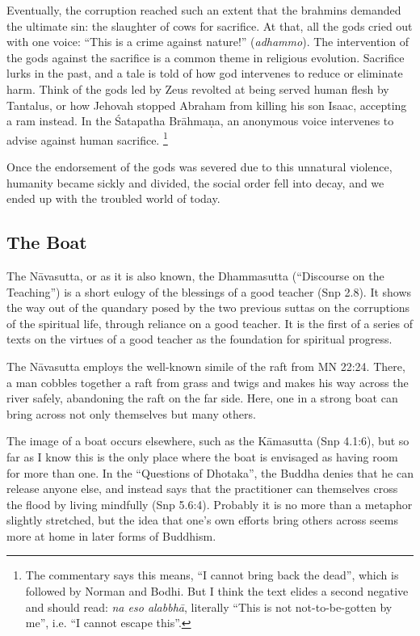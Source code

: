 \documentclass[12pt,openany]{book}%
\begin{document}
Eventually, the corruption reached such an extent that the brahmins demanded the ultimate sin: the slaughter of cows for sacrifice. At that, all the gods cried out with one voice: “This is a crime against nature!” (\textit{adhammo}). The intervention of the gods against the sacrifice is a common theme in religious evolution. Sacrifice lurks in the past, and a tale is told of how god intervenes to reduce or eliminate harm. Think of the gods led by Zeus revolted at being served human flesh by Tantalus, or how Jehovah stopped Abraham from killing his son Isaac, accepting a ram instead. In the Śatapatha \textsanskrit{Brāhmaṇa}, an anonymous voice intervenes to advise against human sacrifice. \footnote{The commentary says this means, “I cannot bring back the dead”, which is followed by Norman and Bodhi. But I think the text elides a second negative and should read: \textit{na eso \textsanskrit{alabbhā}}, literally “This is not not-to-be-gotten by me”, i.e. “I cannot escape this”. }

Once the endorsement of the gods was severed due to this unnatural violence, humanity became sickly and divided, the social order fell into decay, and we ended up with the troubled world of today.

\subsection*{The Boat}

The \textsanskrit{Nāvasutta}, or as it is also known, the Dhammasutta (“Discourse on the Teaching”) is a short eulogy of the blessings of a good teacher (Snp 2.8). It shows the way out of the quandary posed by the two previous suttas on the corruptions of the spiritual life, through reliance on a good teacher. It is the first of a series of texts on the virtues of a good teacher as the foundation for spiritual progress.

The \textsanskrit{Nāvasutta} employs the well-known simile of the raft from MN 22:24. There, a man cobbles together a raft from grass and twigs and makes his way across the river safely, abandoning the raft on the far side. Here, one in a strong boat can bring across not only themselves but many others.

The image of a boat occurs elsewhere, such as the \textsanskrit{Kāmasutta} (Snp 4.1:6), but so far as I know this is the only place where the boat is envisaged as having room for more than one. In the “Questions of Dhotaka”, the Buddha denies that he can release anyone else, and instead says that the practitioner can themselves cross the flood by living mindfully (Snp 5.6:4). Probably it is no more than a metaphor slightly stretched, but the idea that one’s own efforts bring others across seems more at home in later forms of Buddhism.
\end{document}
